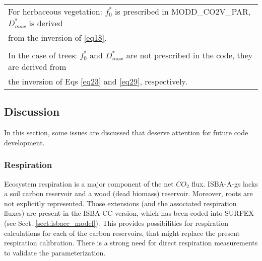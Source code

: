 {{{\begin{center}
\begin{tabular}{|l|}
For herbaceous vegetation: $f_{0}^{*}$ is prescribed in MODD\_CO2V\_PAR, $D_{max}^{*}$ is derived \\
from the inversion of \ref{eq18}. \\ \\

In the case of trees: $f_{0}^{*}$ and $D_{max}^{*}$ are not prescribed in the code, they are derived from \\
the inversion of Eqs \ref{eq23} and \ref{eq29}, respectively. \\
\hline
			\end{tabular}
			\end{center}

}}


\subsection{Discussion}

In this section, some issues are discussed that deserve attention for future code development.

\subsubsection{Respiration}

Ecosystem respiration is a major component of the net $CO_{2}$ flux. ISBA-A-gs lacks a soil carbon
reservoir and a wood (dead biomass) reservoir. Moreover, roots are not explicitly represented.
Those extensions (and the associated respiration fluxes) are present in the ISBA-CC version, 
which has been coded into SURFEX (see Sect. \ref{sect:isbacc_model}).
This provides possibilities for respiration calculations for each of the carbon
reservoirs, that might replace the present respiration calibration. There is a strong need for direct
respiration measurements to validate the parameterization.

}
